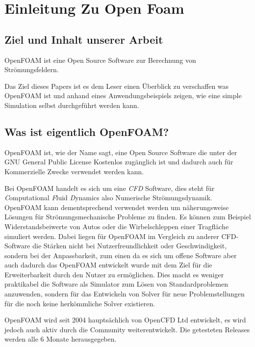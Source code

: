 %
%
%
%
\section{Einleitung Zu Open Foam\label{openfoam:section:Einleitung}}

\subsection{Ziel und Inhalt unserer Arbeit}
OpenFOAM ist eine Open Source Software zur Berechnung von Strömungsfeldern. 

Das Ziel dieses Papers ist es dem Leser einen Überblick zu verschaffen was OpenFOAM ist und anhand eines 
Anwendungsbeispiels zeigen, wie eine simple Simulation selbst durchgeführt werden kann.

\subsection{Was ist eigentlich OpenFOAM?\label{openfoam:section:WasIstOpenFoam}}
OpenFOAM ist, wie der Name sagt, eine Open Source Software die unter der GNU
General Public License Kostenlos zugänglich ist und dadurch auch für Kommerzielle Zwecke 
verwendet werden kann. 

Bei OpenFOAM handelt es sich um eine \emph{CFD} Software, dies steht für \emph{C}omputational \emph{F}luid \emph{D}ynamics also Numerische Strömungsdynamik.
OpenFOAM kann dementsprechend verwendet werden um näherungsweise Lösungen für 
Strömungsmechanische Probleme zu finden.
Es können zum Beispiel Widerstandsbeiwerte von Autos oder die Wirbelschleppen einer Tragfläche simuliert werden.
Dabei liegen für OpenFOAM im Vergleich zu anderer CFD-Software die Stärken nicht bei Nutzerfreundlichkeit oder Geschwindigkeit, sondern bei der Anpassbarkeit, zum einen da es sich um offene Software aber auch dadurch das OpenFOAM entwickelt wurde mit dem Ziel für die Erweiterbarkeit durch den Nutzer zu ermöglichen. Dies macht es weniger praktikabel die Software als Simulator zum Lösen von Standardproblemen anzuwenden, sondern für das Entwickeln von Solver für neue Problemstellungen für die noch keine herkömmliche Solver existieren.

OpenFOAM wird seit 2004 hauptsächlich von OpenCFD Ltd entwickelt, es wird jedoch auch aktiv durch die Community weiterentwickelt.
Die getesteten Releases werden alle 6 Monate herausgegeben. \cite{openfoam:greenshieldsweller2022}

